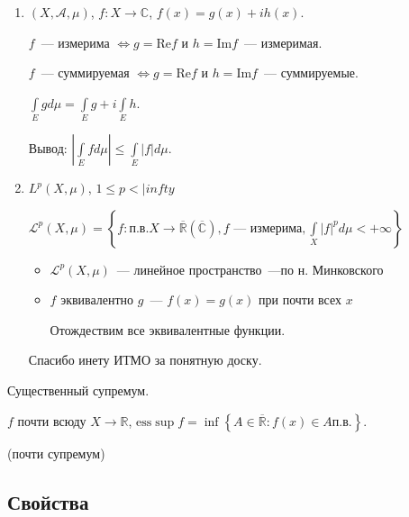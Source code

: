 \documentclass{article}
\begin{document}
    \begin{enumerate}
    
        \item $(X, \mathcal{A}, \mu)$, $f : X \rightarrow \mathbb{C}$, $f(x) = g(x) + i h(x)$.
        
            $f$~--- измерима $\Leftrightarrow g = \mathrm{Re} f$ и $h = \mathrm{Im} f$~--- измеримая.
            
            $f$~--- суммируемая $\Leftrightarrow g = \mathrm{Re} f$ и $h = \mathrm{Im} f$~--- суммируемые.
            
            $\int\limits_E g d\mu = \int\limits_E g + i \int\limits_E h$.
            
            Вывод: $\left| \int\limits_E f d \mu \right| \leqslant \int\limits_E |f| d\mu$.
            
        \item $L^p(X, \mu)$, $1 \leqslant p < |infty$
        
            $\mathcal{L}^p (X, \mu) = \left\{ f : \text{п.в.} X \rightarrow \overline{\mathbb{R}} (\overline{\mathbb{C}}), f \text{~--- измерима}, \int\limits_X |f|^p d \mu < +\infty \right\}$
            
            \begin{itemize}
            
                \item $\mathcal{L}^p (X, \mu)$~--- линейное пространство~---по н. Минковского
            
                \item $f$ эквивалентно $g$~--- $f(x) = g(x)$ при почти всех $x$
                
                    Отождествим все эквивалентные функции.
                
            \end{itemize}
            
            Спасибо инету ИТМО за понятную доску.
            
    \end{enumerate}
    
    Существенный супремум.
    
    $f$ почти всюду $X \rightarrow \mathbb{R}$, $\mathrm{ess}\sup f = \inf \left\{ A \in \overline{\mathbb{R}} : f(x) \in A \text{п.в.} \right\}$.
    
    (почти супремум)
    
    \subsection{Свойства}
    
\end{document}

